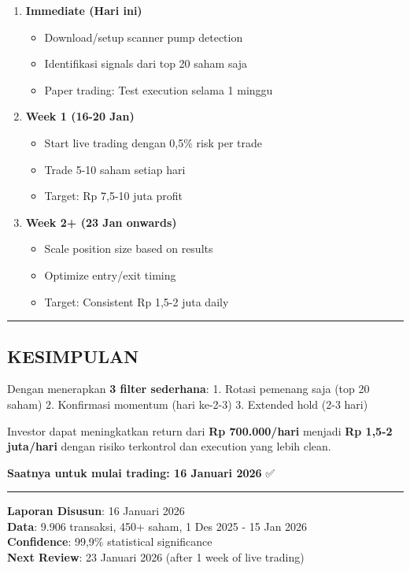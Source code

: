 \documentclass[
  10pt,
  a4paper,
]{article}
\providecommand{\tightlist}{%
  \setlength{\itemsep}{0pt}\setlength{\parskip}{0pt}}\usepackage{longtable,booktabs,array}
\begin{document}
\begin{enumerate}
\def\labelenumi{\arabic{enumi}.}
\tightlist
\item
  \textbf{Immediate (Hari ini)}

  \begin{itemize}
  \tightlist
  \item
    Download/setup scanner pump detection
  \item
    Identifikasi signals dari top 20 saham saja
  \item
    Paper trading: Test execution selama 1 minggu
  \end{itemize}
\item
  \textbf{Week 1 (16-20 Jan)}

  \begin{itemize}
  \tightlist
  \item
    Start live trading dengan 0,5\% risk per trade
  \item
    Trade 5-10 saham setiap hari
  \item
    Target: Rp 7,5-10 juta profit
  \end{itemize}
\item
  \textbf{Week 2+ (23 Jan onwards)}

  \begin{itemize}
  \tightlist
  \item
    Scale position size based on results
  \item
    Optimize entry/exit timing
  \item
    Target: Consistent Rp 1,5-2 juta daily
  \end{itemize}
\end{enumerate}

\begin{center}\rule{0.5\linewidth}{0.5pt}\end{center}

\subsection{KESIMPULAN}\label{kesimpulan}

Dengan menerapkan \textbf{3 filter sederhana}: 1. Rotasi pemenang saja
(top 20 saham) 2. Konfirmasi momentum (hari ke-2-3) 3. Extended hold
(2-3 hari)

Investor dapat meningkatkan return dari \textbf{Rp 700.000/hari} menjadi
\textbf{Rp 1,5-2 juta/hari} dengan risiko terkontrol dan execution yang
lebih clean.

\textbf{Saatnya untuk mulai trading: 16 Januari 2026} ✅

\begin{center}\rule{0.5\linewidth}{0.5pt}\end{center}

\textbf{Laporan Disusun}: 16 Januari 2026\\
\textbf{Data}: 9.906 transaksi, 450+ saham, 1 Des 2025 - 15 Jan 2026\\
\textbf{Confidence}: 99,9\% statistical significance\\
\textbf{Next Review}: 23 Januari 2026 (after 1 week of live trading)
\end{document}
